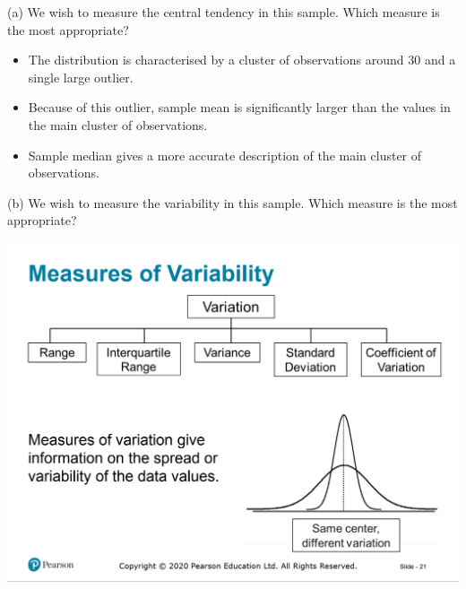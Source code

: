 \documentclass[
  11pt,
  ignorenonframetext,
]{beamer}
\begin{document}
\begin{frame}{(a) We wish to measure the central tendency in this
sample. Which measure is the most appropriate?}
\protect\hypertarget{a-we-wish-to-measure-the-central-tendency-in-this-sample.-which-measure-is-the-most-appropriate-1}{}
\begin{itemize}
\item
  The distribution is characterised by a cluster of observations around
  \(30\) and a single large outlier.
\item
  Because of this outlier, sample mean is significantly larger than the
  values in the main cluster of observations.
\item
  Sample median gives a more accurate description of the main cluster of
  observations.
\end{itemize}
\end{frame}

\begin{frame}{(b) We wish to measure the variability in this sample.
\quad Which measure is the most appropriate?}
\protect\hypertarget{b-we-wish-to-measure-the-variability-in-this-sample.-which-measure-is-the-most-appropriate}{}
\pause

\begin{center}\includegraphics[width=0.8\linewidth]{pictures/Variability} \end{center}
\end{frame}
\end{document}
